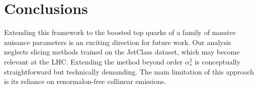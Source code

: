 \section{Conclusions}\label{sec:conclusions}

Extending this framework to the boosted top quarks of a family of
massive nuisance parameters is an exciting direction for future work.
Our analysis neglects slicing methods trained on the JetClass dataset,
which may become relevant at the LHC. Extending the method beyond order
$\alpha_s^2$ is conceptually straightforward but technically demanding.
The main limitation of this approach is its reliance on renormalon-free
collinear emissions.

